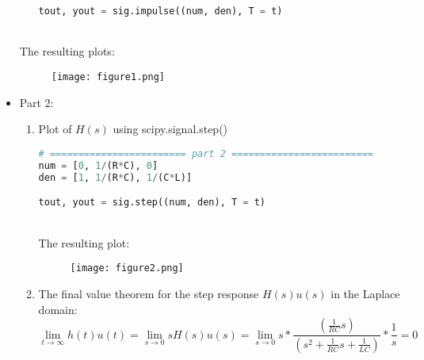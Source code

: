 \documentclass[12pt,a4paper]{article}
\begin{document}
\begin{itemize}
\begin{enumerate}
\begin{lstlisting}[language=Python, caption={impulse response using scipy.signal.impulse()}, label={lst:code}, mathescape=true, breaklines=true]
tout, yout = sig.impulse((num, den), T = t)

\end{lstlisting}

\end{enumerate}

    \\The resulting plots:\\
\begin{figure}[h]
    \centering
    \texttt{[image: figure1.png]}
\end{figure}
\clearpage

    \item
    Part 2:\\

\begin{enumerate}
    \item
    Plot of $H(s)$ using scipy.signal.step()


\begin{lstlisting}[language=Python, caption={impulse response using scipy.signal.step()}, label={lst:code}, mathescape=true, breaklines=true]
# ======================== part 2 =========================
num = [0, 1/(R*C), 0]
den = [1, 1/(R*C), 1/(C*L)]

tout, yout = sig.step((num, den), T = t)
\end{lstlisting}

    \\The resulting plot:\\
\begin{figure}[h]
    \centering
    \texttt{[image: figure2.png]}
\end{figure}\textbf{}

    \item
    The final value theorem for the step response $H(s)u(s)$ in the Laplace domain:\\
    
    $$\lim_{t \to \infty}h(t)u(t) = \lim_{s \to 0} sH(s)u(s) = \lim_{s \to 0} s * \frac{(\frac{1}{RC}s)}{(s^{2} + \frac{1}{RC}s + \frac{1}{LC})} * \frac{1}{s} = 0$$

\end{enumerate}

\end{itemize}
\clearpage
\end{document}
